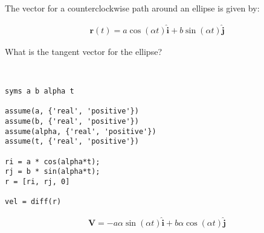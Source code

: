 The vector for a counterclockwise path around an ellipse is given by:

\begin{align*}
    \boldsymbol{r}(t) = a \cos(\alpha t) \hat{\boldsymbol{i}} + b \sin(\alpha t) \hat{\boldsymbol{j}}
\end{align*}

What is the tangent vector for the ellipse?

\begin{solution} \
\begin{lstlisting}
syms a b alpha t

assume(a, {'real', 'positive'})
assume(b, {'real', 'positive'})
assume(alpha, {'real', 'positive'})
assume(t, {'real', 'positive'})

ri = a * cos(alpha*t);
rj = b * sin(alpha*t);
r = [ri, rj, 0]

vel = diff(r)
\end{lstlisting}

\begin{align*}
    \boldsymbol{V} = -a \alpha \sin(\alpha t) \hat{\boldsymbol{i}} + b \alpha \cos(\alpha t) \hat{\boldsymbol{j}}
\end{align*}
\end{solution}